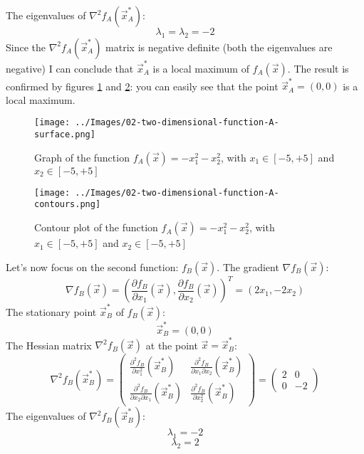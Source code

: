     The eigenvalues of \(\nabla^2 f_A(\vec{x}^*_A)\):
    \[\lambda_1 = \lambda_2 = -2\]
    Since the \(\nabla^2 f_A(\vec{x}_A^*)\) matrix is negative definite (both the eigenvalues are negative) I can conclude that \(\vec{x}^*_A\) is a local maximum of \(f_A(\vec{x})\). The result is confirmed by figures \ref{two-dimensional-function-A-surface} and \ref{two-dimensional-function-A-contours}: you can easily see that the point \(\vec{x}_A^* = (0, 0)\) is a local maximum.\par
    \begin{figure}
        \centering
        \texttt{[image: ../Images/02-two-dimensional-function-A-surface.png]}
        \caption{Graph of the function \(f_A(\vec{x}) = - x_{1}^{2} - x_{2}^{2}\), with \(x_1 \in [-5, +5]\) and \(x_2 \in [-5, +5]\)}
        \label{two-dimensional-function-A-surface}
    \end{figure}
    \begin{figure}
        \centering
        \texttt{[image: ../Images/02-two-dimensional-function-A-contours.png]}
        \caption{Contour plot of the function \(f_A(\vec{x}) = - x_{1}^{2} - x_{2}^{2}\), with \(x_1 \in [-5, +5]\) and \(x_2 \in [-5, +5]\)}
        \label{two-dimensional-function-A-contours}
    \end{figure}
    Let's now focus on the second function: \(f_B(\vec{x})\). The gradient \(\nabla f_B(\vec{x})\):
    \[\nabla f_B(\vec{x}) = \left (\frac{\partial f_B}{\partial x_1}(\vec{x}), \frac{\partial f_B}{\partial x_2}(\vec{x}) \right )^T = (2x_1, -2x_2)\]
    The stationary point \(\vec{x}_B^*\) of \(f_B(\vec{x})\):
    \[\vec{x}_B^* = (0, 0)\]
    The Hessian matrix \(\nabla^2 f_B(\vec{x})\) at the point \(\vec{x} = \vec{x}_B^*\):
    \[
        \nabla^2 f_B(\vec{x}_B^*) =
        \begin{pmatrix}
            \frac{\partial^2 f_B}{\partial x_1^2}(\vec{x}^*_B) &
            \frac{\partial^2 f_B}{\partial x_1 \partial x_2}(\vec{x}^*_B) \\
            \frac{\partial^2 f_B}{\partial x_2 \partial x_1}(\vec{x}^*_B) &
            \frac{\partial^2 f_B}{\partial x_2^2}(\vec{x}^*_B)
        \end{pmatrix}
        =
        \begin{pmatrix}
            2 & 0 \\
            0 & -2
        \end{pmatrix}
    \]
    The eigenvalues of \(\nabla^2 f_B(\vec{x}^*_B)\):
    \[\lambda_1 = -2\]
    \[\lambda_2 = 2\]
